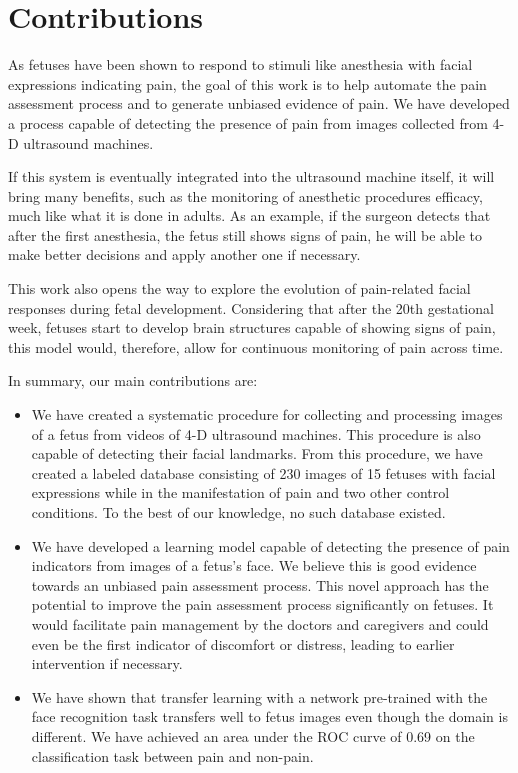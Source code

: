 \section{Contributions}

As fetuses have been shown to respond to stimuli like anesthesia with facial expressions indicating pain, the goal of this work is to help automate the pain assessment process and to generate unbiased evidence of pain. We have developed a process capable of detecting the presence of pain from images collected from 4-D ultrasound machines.

If this system is eventually integrated into the ultrasound machine itself, it will bring many benefits, such as the monitoring of anesthetic procedures efficacy, much like what it is done in adults. As an example, if the surgeon detects that after the first anesthesia, the fetus still shows signs of pain, he will be able to make better decisions and apply another one if necessary.

This work also opens the way to explore the evolution of pain-related facial responses during fetal development. Considering that after the 20th gestational week, fetuses start to develop brain structures capable of showing signs of pain, this model would, therefore, allow for continuous monitoring of pain across time.

In summary, our main contributions are:

\begin{itemize}
    \item We have created a systematic procedure for collecting and processing images of a fetus from videos of 4-D ultrasound machines. This procedure is also capable of detecting their facial landmarks. From this procedure, we have created a labeled database consisting of 230 images of 15 fetuses with facial expressions while in the manifestation of pain and two other control conditions. To the best of our knowledge, no such database existed.
    
    \item We have developed a learning model capable of detecting the presence of pain indicators from images of a fetus's face. We believe this is good evidence towards an unbiased pain assessment process. This novel approach has the potential to improve the pain assessment process significantly on fetuses. It would facilitate pain management by the doctors and caregivers and could even be the first indicator of discomfort or distress, leading to earlier intervention if necessary.
    
    \item We have shown that transfer learning with a network pre-trained with the face recognition task transfers well to fetus images even though the domain is different. We have achieved an area under the ROC curve of 0.69 on the classification task between pain and non-pain.
\end{itemize}

